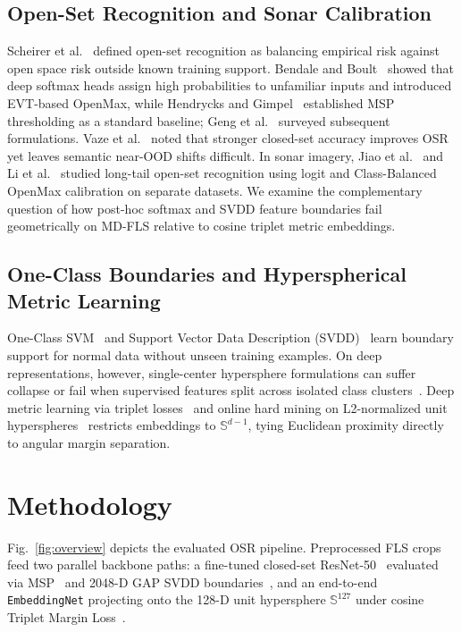 \documentclass[conference]{IEEEtran}
\begin{document}
\subsection{Open-Set Recognition and Sonar Calibration}
Scheirer et al.~\cite{scheirer_2013_osr} defined open-set recognition as balancing empirical risk against open space risk outside known training support. Bendale and Boult~\cite{bendale_2016_openmax} showed that deep softmax heads assign high probabilities to unfamiliar inputs and introduced EVT-based OpenMax, while Hendrycks and Gimpel~\cite{hendrycks_2017_msp} established MSP thresholding as a standard baseline; Geng et al.~\cite{geng_2021_survey} surveyed subsequent formulations. Vaze et al.~\cite{vaze_2022_osr} noted that stronger closed-set accuracy improves OSR yet leaves semantic near-OOD shifts difficult. In sonar imagery, Jiao et al.~\cite{jiao_2024_sonar_osr} and Li et al.~\cite{li_2026_copenmax} studied long-tail open-set recognition using logit and Class-Balanced OpenMax calibration on separate datasets. We examine the complementary question of how post-hoc softmax and SVDD feature boundaries fail geometrically on MD-FLS relative to cosine triplet metric embeddings.

\subsection{One-Class Boundaries and Hyperspherical Metric Learning}
One-Class SVM~\cite{scholkopf_2001_ocsvm} and Support Vector Data Description (SVDD)~\cite{tax_2004_svdd} learn boundary support for normal data without unseen training examples. On deep representations, however, single-center hypersphere formulations can suffer collapse or fail when supervised features split across isolated class clusters~\cite{chong_2020_ijcnn}. Deep metric learning via triplet losses~\cite{hoffer_2015_triplet} and online hard mining on L2-normalized unit hyperspheres~\cite{schroff_2015_facenet,musgrave_2020_pml} restricts embeddings to $\mathbb{S}^{d-1}$, tying Euclidean proximity directly to angular margin separation.

\section{Methodology}
\label{sec:method}

Fig.~\ref{fig:overview} depicts the evaluated OSR pipeline. Preprocessed FLS crops feed two parallel backbone paths: a fine-tuned closed-set ResNet-50~\cite{he_2016_resnet} evaluated via MSP~\cite{hendrycks_2017_msp} and 2048-D GAP SVDD boundaries~\cite{tax_2004_svdd}, and an end-to-end \texttt{EmbeddingNet} projecting onto the 128-D unit hypersphere $\mathbb{S}^{127}$ under cosine Triplet Margin Loss~\cite{schroff_2015_facenet,musgrave_2020_pml}.
\end{document}
